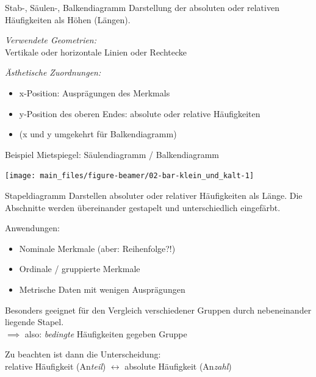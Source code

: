 \documentclass[
  10pt,
  ignorenonframetext,
]{beamer}
\providecommand{\tightlist}{%
  \setlength{\itemsep}{0pt}\setlength{\parskip}{0pt}}
\begin{document}
\begin{frame}{Stab-, Säulen-, Balkendiagramm}
\label{stab--suxe4ulen--balkendiagramm-1}
Darstellung der absoluten oder relativen Häufigkeiten als Höhen
(Längen).

\emph{Verwendete Geometrien:}\\
Vertikale oder horizontale Linien oder Rechtecke

\emph{Ästhetische Zuordnungen:}

\begin{itemize}
\tightlist
\item
  x-Position: Ausprägungen des Merkmals
\item
  y-Position des oberen Endes: absolute oder relative Häufigkeiten
\item
  (x und y umgekehrt für Balkendiagramm)
\end{itemize}
\end{frame}

\begin{frame}{Beispiel Mietspiegel: Säulendiagramm / Balkendiagramm}
\label{beispiel-mietspiegel-suxe4ulendiagramm-balkendiagramm}
\scriptsize

\begin{center}\texttt{[image: main\_files/figure-beamer/02-bar-klein\_und\_kalt-1]} \end{center}

\normalsize
\end{frame}

\begin{frame}{Stapeldiagramm}
\label{stapeldiagramm}
Darstellen absoluter oder relativer Häufigkeiten als Länge. Die
Abschnitte werden übereinander gestapelt und unterschiedlich eingefärbt.

Anwendungen:

\begin{itemize}
\tightlist
\item
  Nominale Merkmale (aber: Reihenfolge?!)
\item
  Ordinale / gruppierte Merkmale
\item
  Metrische Daten mit wenigen Ausprägungen
\end{itemize}

Besonders geeignet für den Vergleich verschiedener Gruppen durch
nebeneinander liegende Stapel.\\
\(\implies\) also: \emph{bedingte} Häufigkeiten gegeben Gruppe

Zu beachten ist dann die Unterscheidung:\\
relative Häufigkeit (An\emph{teil}) \(\leftrightarrow\) absolute
Häufigkeit (An\emph{zahl})
\end{frame}
\end{document}
